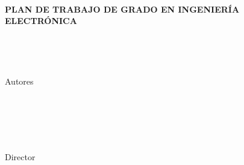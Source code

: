
\thispagestyle{empty} %

\noindent \begin{center}
\textbf{\large ~}
\par\end{center}{\large \par}

\begin{center}
\textbf{\Large PLAN  DE   TRABAJO DE GRADO  EN  INGENIERÍA  ELECTRÓNICA}
\par\end{center}{\Large \par}

\noindent \begin{center}
\textbf{\large ~}
\par\end{center}{\large \par}

\noindent \begin{center}
\begin{enumerate}
\end{enumerate}
\textbf{{\emph{\LARGE \inserttitulo }}}
\par\end{center}{\LARGE \par}

\noindent \begin{center}
\textbf{\large ~}
\par\end{center}{\large \par}

\noindent \begin{center} %
\LARGE Autores\\
\Large \textsc{\insertautoruno} \\
\Large \textsc{\insertautordos} \\
\textbf{\large ~}
\par\end{center}{\large \par}

\noindent \begin{center}
\textbf{\large ~}
\par\end{center}{\large \par}

\begin{singlespace}
\noindent \begin{center}
{\large Director }\\
{\Large \textsc{\insertdirector} }\textbf{\large }\\
{\large \insertcargodirector }
\par\end{center}{\large \par}
\end{singlespace}

